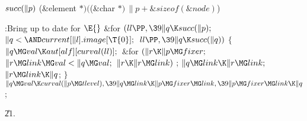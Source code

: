 \B\D$\\{succ}(\|p)$ \5
(\&{element} ${}{*})({}$(\&{char} ${}{*})\,\|p+\&{sizeof}(\&{node}){}$)\par
\Y\B\4:Bring  up to date for %
\X${}\E{}$\6
\&{for} ${}(\\{ll}\PP,\39\|q\K\\{succ}(\|p);{}$ ${}\|q<{\AND}\\{current}[\|l].%
\\{image}[\T{0}];{}$ ${}\\{ll}\PP,\39\|q\K\\{succ}(\|q)){}$\5
${}\{{}$\1\6
${}\|q\MG\\{val}\K\\{aut}[\\{alf}][\\{curval}(\\{ll})];{}$\6
\&{for} ${}(\|r\K\|p\MG\\{fixer};{}$ ${}\|r\MG\\{link}\MG\\{val}<\|q\MG%
\\{val};{}$ ${}\|r\K\|r\MG\\{link}){}$\1\5
;\2\6
${}\|q\MG\\{link}\K\|r\MG\\{link};{}$\6
${}\|r\MG\\{link}\K\|q{}$;\6
\4${}\}{}$\2\6
${}\|q\MG\\{val}\K\\{curval}(\|p\MG\\{tlevel}),\39\|q\MG\\{link}\K\|p\MG%
\\{fixer}\MG\\{link},\39\|p\MG\\{fixer}\MG\\{link}\K\|q{}$;\par
\U21.\fi


